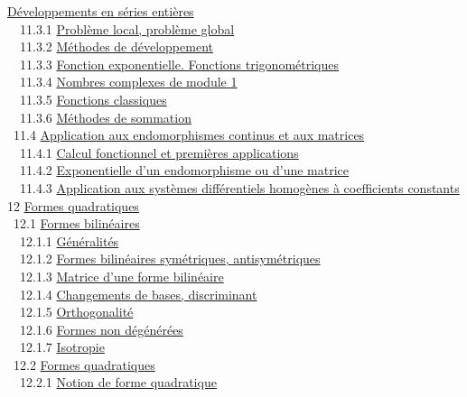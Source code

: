 \documentclass[]{article}
\begin{document}
\href{coursse65.html\#x79-34900011.3}{Développements en séries entières}
\\ ~~11.3.1 \href{coursse65.html\#x79-35000011.3.1}{Problème local,
problème global} \\ ~~11.3.2
\href{coursse65.html\#x79-35100011.3.2}{Méthodes de développement} \\
~~11.3.3 \href{coursse65.html\#x79-35200011.3.3}{Fonction exponentielle.
Fonctions trigonométriques} \\ ~~11.3.4
\href{coursse65.html\#x79-35300011.3.4}{Nombres complexes de module 1}
\\ ~~11.3.5 \href{coursse65.html\#x79-35400011.3.5}{Fonctions
classiques} \\ ~~11.3.6 \href{coursse65.html\#x79-35500011.3.6}{Méthodes
de sommation} \\ ~11.4 \href{coursse66.html\#x80-35800011.4}{Application
aux endomorphismes continus et aux matrices} \\ ~~11.4.1
\href{coursse66.html\#x80-35900011.4.1}{Calcul fonctionnel et premières
applications} \\ ~~11.4.2
\href{coursse66.html\#x80-36000011.4.2}{Exponentielle d'un endomorphisme
ou d'une matrice} \\ ~~11.4.3
\href{coursse66.html\#x80-36100011.4.3}{Application aux systèmes
différentiels homogènes à coefficients constants} \\ 12
\href{coursch13.html\#x81-36200012}{Formes quadratiques} \\ ~12.1
\href{coursse67.html\#x82-36300012.1}{Formes bilinéaires} \\ ~~12.1.1
\href{coursse67.html\#x82-36400012.1.1}{Généralités} \\ ~~12.1.2
\href{coursse67.html\#x82-36500012.1.2}{Formes bilinéaires symétriques,
antisymétriques} \\ ~~12.1.3
\href{coursse67.html\#x82-36600012.1.3}{Matrice d'une forme bilinéaire}
\\ ~~12.1.4 \href{coursse67.html\#x82-36700012.1.4}{Changements de
bases, discriminant} \\ ~~12.1.5
\href{coursse67.html\#x82-36800012.1.5}{Orthogonalité} \\ ~~12.1.6
\href{coursse67.html\#x82-36900012.1.6}{Formes non dégénérées} \\
~~12.1.7 \href{coursse67.html\#x82-37000012.1.7}{Isotropie} \\ ~12.2
\href{coursse68.html\#x83-37100012.2}{Formes quadratiques} \\ ~~12.2.1
\href{coursse68.html\#x83-37200012.2.1}{Notion de forme quadratique} \\
\end{document}
